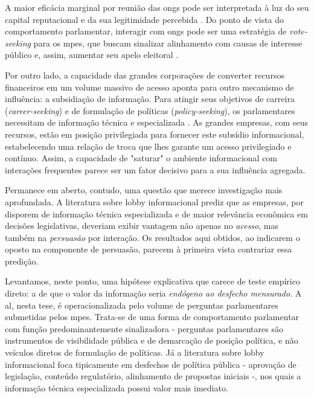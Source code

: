 A maior eficácia marginal por reunião das \acrshort{ong}s pode ser interpretada à luz do seu capital reputacional e da sua legitimidade percebida \cite{bunea2018legitimacy}. Do ponto de vista do comportamento parlamentar, interagir com \acrshort{ong}s pode ser uma estratégia de \textit{vote-seeking} para os \acrshort{mpe}s, que buscam sinalizar alinhamento com causas de interesse público e, assim, aumentar seu apelo eleitoral \cite{Ibenskas2021, mayhew2004congress}.

Por outro lado, a capacidade das grandes corporações de converter recursos financeiros em um volume massivo de acesso aponta para outro mecanismo de influência: a subsidiação de informação. Para atingir seus objetivos de carreira (\textit{career-seeking}) e de formulação de políticas (\textit{policy-seeking}), os parlamentares necessitam de informação técnica e especializada \cite{daniel2015career, kluver_informational_2012}. As grandes empresas, com seus recursos, estão em posição privilegiada para fornecer este subsídio informacional, estabelecendo uma relação de troca \cite{huwyler_no_2023} que lhes garante um acesso privilegiado e contínuo. Assim, a capacidade de "saturar" o ambiente informacional com interações frequentes parece ser um fator decisivo para a sua influência agregada.

Permanece em aberto, contudo, uma questão que merece investigação mais aprofundada. A literatura sobre lobby informacional \cite{kluver_informational_2012, de_figueiredo_advancing_2014, Hall2006} prediz que as empresas, por disporem de informação técnica especializada e de maior relevância econômica em decisões legislativas, deveriam exibir vantagem não apenas no \textit{acesso}, mas também na \textit{persuasão} por interação. Os resultados aqui obtidos, ao indicarem o oposto na componente de persuasão, parecem à primeira vista contrariar essa predição.

Levantamos, neste ponto, uma hipótese explicativa que carece de teste empírico direto: a de que o valor da informação seria \textit{endógeno ao desfecho mensurado}. A \acrshort{al}, nesta tese, é operacionalizada pelo volume de perguntas parlamentares submetidas pelos \acrshort{mpe}s. Trata-se de uma forma de comportamento parlamentar com função predominantemente sinalizadora - perguntas parlamentares são instrumentos de visibilidade pública e de demarcação de posição política, e não veículos diretos de formulação de políticas. Já a literatura sobre lobby informacional foca tipicamente em desfechos de política pública - aprovação de legislação, conteúdo regulatório, alinhamento de propostas iniciais \cite{yackee2006sweet, kluver2015legislative} -, nos quais a informação técnica especializada possui valor mais imediato.

